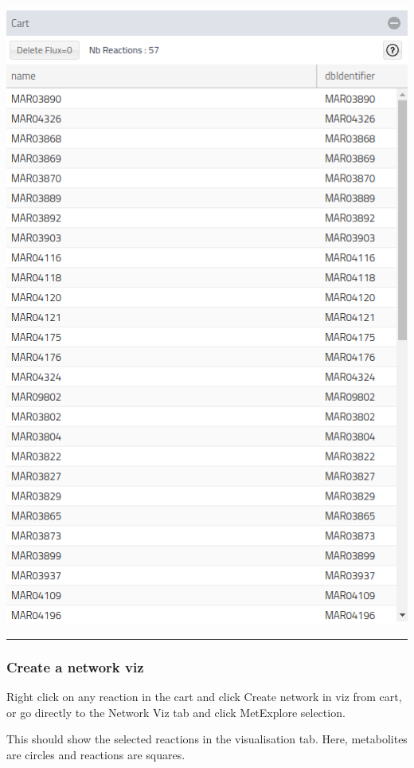 \documentclass[
  24px,
  letterpaper,
  DIV=11,
  numbers=noendperiod]{scrartcl}
\begin{document}
\includegraphics{images/metexplore_cart.png}

\begin{center}\rule{0.5\linewidth}{0.5pt}\end{center}

\hypertarget{create-a-network-viz}{%
\subsubsection{Create a network viz}\label{create-a-network-viz}}

Right click on any reaction in the cart and click Create network in viz
from cart, or go directly to the Network Viz tab and click MetExplore
selection.

This should show the selected reactions in the visualisation tab. Here,
metabolites are circles and reactions are squares.
\end{document}
